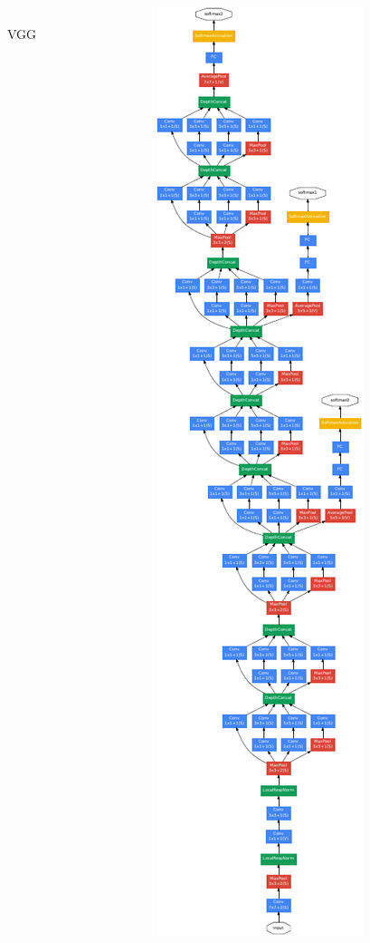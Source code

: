 \documentclass[english,usenames,dvipsnames]{beamer}
\begin{document}
\begin{frame}
\begin{columns}
\begin{column}{0.3\textwidth}
			\\VGG
		\end{column}
		\begin{column}{0.4\textwidth}
			\centering
			\includegraphics[scale=0.32]{GoogLeNet.pdf}

\end{column}
\end{columns}
\end{frame}
\end{document}
